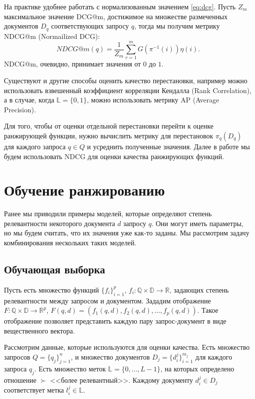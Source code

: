 \documentclass[specialist,
               substylefile = spbu.rtx,
               subf,href,colorlinks=true, 12pt]{disser}
\begin{document}
На практике удобнее работать с нормализованным значением \eqref{eq:dcg}. Пусть $Z_m$ максимальное значение DCG@m, достижимое на множестве размеченных документов $D_q$ соответствующих запросу $q$, тогда мы получим метрику NDCG@m (Normailized DCG):
\begin{equation}
\label{eq:ndcg}
NDCG@m(q)=\frac{1}{Z_m}\sum_{r=1}^{m}{G(\pi^{-1}(i))\eta(i)}.
\end{equation} NDCG@m, очевидно, принимает значения от $0$ до $1$.\par

Существуют и другие способы оценить качество перестановки, например можно использовать взвешенный коэффициент корреляции Кендалла (Rank Correlation)\cite{IntL2R}, а в случае, когда $\mathbb L = \{0, 1\}$, можно использовать метрику AP (Average Precision)\cite{MAP}.\par

Для того, чтобы от оценки отдельной перестановки перейти к оценке ранжирующей функции, нужно вычислить метрику для перестановок $\pi_q(D_q)$ для каждого запроса $q \in Q$ и усреднить полученные значения. Далее в работе мы будем использовать NDCG для оценки качества ранжирующих функций.\par

\section{Обучение ранжированию}

Ранее мы приводили примеры моделей, которые определяют степень релевантности некоторого документа $d$ запросу $q$. Они могут иметь параметры, но мы будем считать, что их значения уже как-то заданы. Мы рассмотрим задачу комбинирования нескольких таких моделей.\par

\subsection{Обучающая выборка}

Пусть есть множество функций $\{f_i\}_{i=1}^{p}$, $f_i: \mathbb Q \times \mathbb D \rightarrow \mathbb R$, задающих степень релевантности между запросом и документом. Зададим отображение $F: \mathbb Q \times \mathbb D \rightarrow \mathbb R^p$, $F(q, d) = (f_1(q, d), f_2(q, d), \ldots, f_p(q, d))$. Такое отображение позволяет представить каждую пару запрос-документ в виде вещественного вектора.\par

Рассмотрим данные, которые используются для оценки качества. Есть множество запросов $Q = \{q_j\}_{j=1}^n$, и множество документов $D_j = \{d^j_i\}_{i=1}^{m_j}$ для каждого запроса $q_j$. Есть множество меток $\mathbb L = \{0, \ldots, L-1\}$, на которых определено отношение $\succ$ <<более релевантный>>. Каждому документу $d^j_i \in D_j$ соответствует метка $l^j_i \in \mathbb L$.\par 
\end{document}
